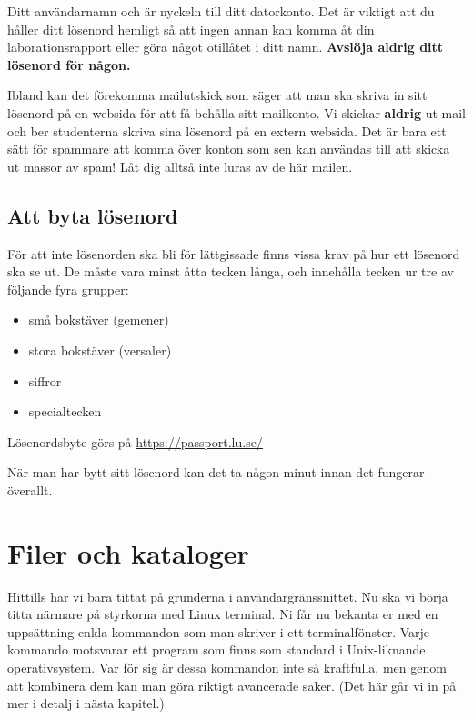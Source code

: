 \documentclass[a4paper,twocolumn]{book}
\begin{document}
Ditt användarnamn och  är nyckeln till ditt
datorkonto. Det är viktigt att du håller ditt lösenord hemligt så att
ingen annan kan komma åt din laborationsrapport eller göra något
otillåtet i ditt namn. \textbf{Avslöja aldrig ditt lösenord för någon.}

Ibland kan det förekomma mailutskick som säger att man ska skriva in sitt
lösenord på en websida för att få behålla sitt mailkonto.  Vi skickar
\textbf{aldrig} ut mail och ber studenterna skriva sina lösenord på en extern
websida. Det är bara ett sätt för spammare att komma över konton som sen
kan användas till att skicka ut massor av spam! Låt dig alltså inte luras av de
här mailen.

\subsection{Att byta lösenord}

För att inte lösenorden ska bli för lättgissade finns vissa
krav på hur ett lösenord ska se ut. De måste vara minst åtta tecken
långa, och innehålla tecken ur tre av följande fyra grupper:
\begin{itemize}
\item små bokstäver (gemener)
\item stora bokstäver (versaler)
\item siffror
\item specialtecken
\end{itemize}

Lösenordsbyte görs på
\url{https://passport.lu.se/}

När man har bytt sitt lösenord kan det ta någon minut innan det fungerar
överallt.

\section{Filer och kataloger}

Hittills har vi bara tittat på grunderna i användargränssnittet. Nu ska vi börja
titta närmare på styrkorna med Linux terminal. Ni får nu bekanta er med en uppsättning
enkla kommandon som man skriver i ett terminalfönster. Varje kommando motsvarar ett program som finns som standard i Unix-liknande operativsystem.
Var för sig är dessa kommandon inte så kraftfulla, men genom att kombinera dem kan man göra
riktigt avancerade saker. (Det här går vi in på mer i detalj i nästa kapitel.)
\end{document}

